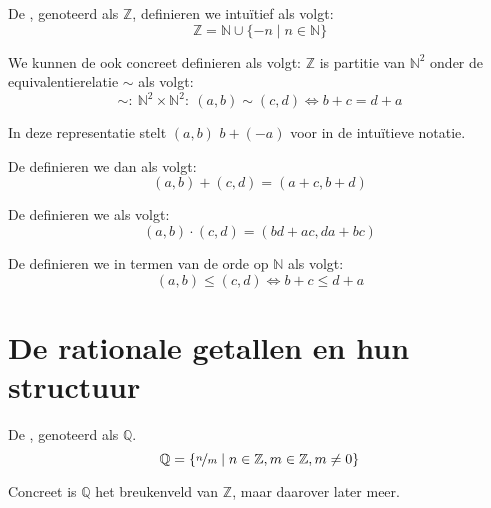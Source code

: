\documentclass[main.tex]{subfiles}
\begin{document}
\begin{de}
  De , genoteerd als $\mathbb{Z}$, definieren we intu\"itief als volgt:
  \[ \mathbb{Z} = \mathbb{N} \cup \{ -n \mid n\in \mathbb{N} \}  \]
\end{de}

\begin{de}
  We kunnen de  ook concreet definieren als volgt:
  $\mathbb{Z}$ is partitie van $\mathbb{N}^{2}$ onder de equivalentierelatie $\sim$ als volgt:
  \[ \sim:\ \mathbb{N}^{2} \times \mathbb{N}^{2}:\ (a,b) \sim (c,d) \Leftrightarrow b+c = d+a \]
\end{de}

\begin{opm}
  In deze representatie stelt $(a,b)$ $b+(-a)$ voor in de intu\"itieve notatie.
\end{opm}

\begin{de}
  De  definieren we dan als volgt:
  \[ (a,b) + (c,d) = (a+c,b+d) \]
\end{de}

\begin{de}
  De  definieren we als volgt:
  \[ (a,b) \cdot (c,d) = (bd+ac,da+bc) \]
\end{de}

\begin{de}
  De  definieren we in termen van de orde op $\mathbb{N}$ als volgt:
  \[ (a,b) \le (c,d) \Leftrightarrow b+c \le d+a \]
\end{de}



\section{De rationale getallen en hun structuur}
\label{sec:de-rati-getall}

\begin{de}
  De , genoteerd als $\mathbb{Q}$.
  \[ \mathbb{Q} = \{ \nicefrac{n}{m} \mid n\in \mathbb{Z}, m\in \mathbb{Z}, m \neq 0 \} \]
\end{de}

\begin{de}
  Concreet is $\mathbb{Q}$ het breukenveld van $\mathbb{Z}$, maar daarover later meer.
\end{de}
\end{document}
